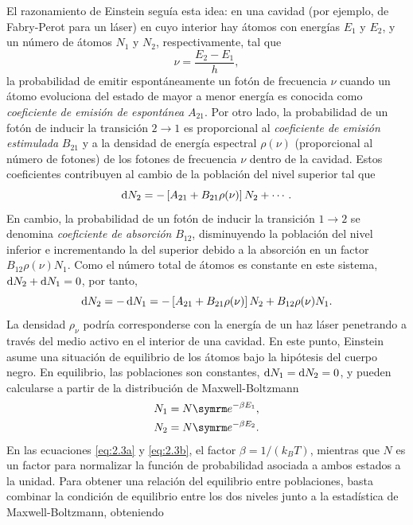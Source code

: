 El razonamiento de Einstein seguía esta idea: en una cavidad (por ejemplo, de Fabry-Perot para un láser) en cuyo interior hay átomos con energías $E_{1}$ y $E_{2}$, y un número de átomos $N_{1}$ y $N_{2}$, respectivamente, tal que 
\begin{equation}\label{eq:2.0}
  \nu = \frac{E_{2}-E_{1}}{h},
\end{equation}
la probabilidad de emitir espontáneamente un fotón de frecuencia $\nu$ cuando un átomo evoluciona del estado de mayor a menor energía es conocida como \emph{coeficiente de emisión de espontánea} $A_{21}$. Por otro lado, la probabilidad de un fotón de inducir la transición $2 \rightarrow 1$ es proporcional al \emph{coeficiente de emisión estimulada} $B_{21}$ y a la densidad de energía espectral $\rho(\nu)$ (proporcional al número de fotones) de los fotones de frecuencia $\nu$ dentro de la cavidad. Estos coeficientes contribuyen al cambio de la población del nivel superior tal que 
\begin{equation}\label{eq:2.1}
  \operatorname{d}\! N_{2} = -\left[A_{21} + B_{21} \rho(\nu)\right]N_{2} + \cdots.
\end{equation}
En cambio, la probabilidad de un fotón de inducir la transición $1 \rightarrow 2$ se denomina \emph{coeficiente de absorción} $B_{12}$, disminuyendo la población del nivel inferior e incrementando la del superior debido a la absorción en un factor $B_{12} \rho(\nu)N_{1}$. Como el número total de átomos es constante en este sistema, $\operatorname{d}\! N_{2}+\operatorname{d}\! N_{1}=0$, por tanto,
\begin{equation}\label{eq:2.2}
  \operatorname{d}\! N_{2} = -\operatorname{d}\! N_{1} = -\left[A_{21} + B_{21} \rho(\nu)\right]N_{2} + B_{12} \rho(\nu)N_{1}.
\end{equation}
La densidad $\rho_{\nu}$ podría corresponderse con la energía de un haz láser penetrando a través del medio activo en el interior de una cavidad. En este punto, Einstein asume una situación de equilibrio de los átomos bajo la hipótesis del cuerpo negro. En equilibrio, las poblaciones son constantes, $\operatorname{d}\! N_{1} = \operatorname{d}\! N_{2} = 0$, y pueden calcularse a partir de la distribución de Maxwell-Boltzmann \autocite{Feynman2011} 
\begin{align}
  \label{eq:2.3a}
  N_{1} &= N \eu^{-\beta E_{1}}, \\
  \label{eq:2.3b}
  N_{2} &= N \eu^{-\beta E_{2}}.
\end{align}
En las ecuaciones \eqref{eq:2.3a} y \eqref{eq:2.3b}, el factor $\beta = 1/(k_{B}T)$, mientras que $N$ es un factor para normalizar la función de probabilidad asociada a ambos estados a la unidad. Para obtener una relación del equilibrio entre poblaciones, basta combinar la condición de equilibrio entre los dos niveles junto a la estadística de Maxwell-Boltzmann, obteniendo 
